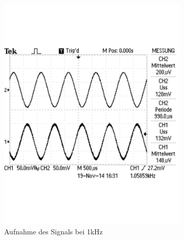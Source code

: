 \documentclass[12pt,a4paper]{article}
\begin{document}
\begin{figure}[H]
        \centering
        \begin{subfigure}[b]{0.28\textwidth}
                \includegraphics[width=\textwidth , scale = 0.4]{2_4_1_1k.pdf}
                \caption[Aufnahme des Signals bei 1kHz]{Aufnahme des Signals bei 1kHz}
                \label{fig:2_4_1_1k}
        \end{subfigure}%
        \hfill
        \begin{subfigure}[b]{0.28\textwidth}

\end{subfigure}
\end{figure}
\end{document}
